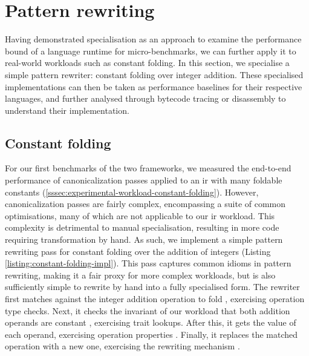 \section{Pattern rewriting}
\label{sec:specialising-pattern-rewriting}

Having demonstrated specialisation as an approach to examine the performance bound of a language runtime for micro-benchmarks, we can further apply it to real-world workloads such as constant folding.
In this section, we specialise a simple pattern rewriter: constant folding over integer addition.
These specialised implementations can then be taken as performance baselines for their respective languages, and further analysed through bytecode tracing or disassembly to understand their implementation.


\subsection{Constant folding}
\label{sec:specialising-pattern-rewriting-workload}

For our first benchmarks of the two frameworks, we measured the end-to-end performance of canonicalization passes applied to an \ac{ir} with many foldable constants (\autoref{sssec:experimental-workload-constant-folding}).
However, canonicalization passes are fairly complex, encompassing a suite of common optimisations, many of which are not applicable to our \ac{ir} workload. This complexity is detrimental to manual specialisation, resulting in more code requiring transformation by hand.
As such, we implement a simple pattern rewriting pass for constant folding over the addition of integers (Listing \ref{listing:constant-folding-impl}). This pass captures common idioms in pattern rewriting, making it a fair proxy for more complex workloads, but is also sufficiently simple to rewrite by hand into a fully specialised form.
The rewriter first matches against the integer addition operation to fold , exercising operation type checks. Next, it checks the invariant of our workload that both addition operands are constant , exercising trait lookups. After this, it gets the value of each operand, exercising operation properties . Finally, it replaces the matched operation with a new one, exercising the rewriting mechanism .

